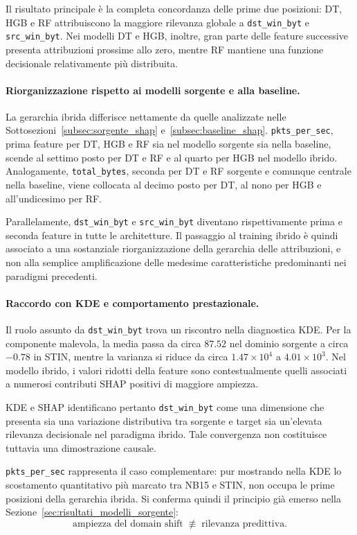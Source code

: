 Il risultato principale è la completa concordanza delle prime due posizioni: DT, HGB e RF attribuiscono la maggiore rilevanza globale a \texttt{dst\_win\_byt} e \texttt{src\_win\_byt}. 
Nei modelli DT e HGB, inoltre, gran parte delle feature successive presenta attribuzioni prossime allo zero, mentre RF mantiene una funzione decisionale relativamente più distribuita.

\paragraph{Riorganizzazione rispetto ai modelli sorgente e alla baseline.}
La gerarchia ibrida differisce nettamente da quelle analizzate nelle Sottosezioni~\ref{subsec:sorgente_shap} e~\ref{subsec:baseline_shap}.
\texttt{pkts\_per\_sec}, prima feature per DT, HGB e RF sia nel modello sorgente sia nella baseline, scende al settimo posto per DT e RF e al quarto per HGB nel modello ibrido. 
Analogamente, \texttt{total\_bytes}, seconda per DT e RF sorgente e comunque centrale nella baseline, viene collocata al decimo posto per DT, al nono per HGB e all'undicesimo per RF.

Parallelamente, \texttt{dst\_win\_byt} e \texttt{src\_win\_byt} diventano rispettivamente prima e seconda feature in tutte le architetture. 
Il passaggio al training ibrido è quindi associato a una sostanziale riorganizzazione della gerarchia delle attribuzioni, e non alla semplice amplificazione delle medesime caratteristiche predominanti nei paradigmi precedenti.

\paragraph{Raccordo con KDE e comportamento prestazionale.}
Il ruolo assunto da \texttt{dst\_win\_byt} trova un riscontro nella diagnostica KDE. 
Per la componente malevola, la media passa da circa $87.52$ nel dominio sorgente a circa $-0.78$ in STIN, mentre la varianza si riduce da circa $1.47\times10^{4}$ a $4.01\times10^{3}$. 
Nel modello ibrido, i valori ridotti della feature sono contestualmente quelli associati a numerosi contributi SHAP positivi di maggiore ampiezza.

KDE e SHAP identificano pertanto \texttt{dst\_win\_byt} come una dimensione che presenta sia una variazione distributiva tra sorgente e target sia un'elevata rilevanza decisionale nel paradigma ibrido. 
Tale convergenza non costituisce tuttavia una dimostrazione causale.

\texttt{pkts\_per\_sec} rappresenta il caso complementare: pur mostrando nella KDE lo scostamento quantitativo più marcato tra NB15 e STIN, non occupa le prime posizioni della gerarchia ibrida. 
Si conferma quindi il principio già emerso nella Sezione~\ref{sec:risultati_modelli_sorgente}:
\[
    \text{ampiezza del domain shift}
    \;\not\equiv\;
    \text{rilevanza predittiva}.
\]

